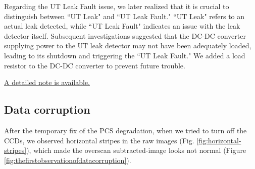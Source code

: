 Regarding the UT Leak Fault issue, we later realized that it is crucial to distinguish between ``UT Leak" and ``UT Leak Fault." ``UT Leak" refers to an actual leak detected, while ``UT Leak Fault" indicates an issue with the leak detector itself. Subsequent investigations suggested that the DC-DC converter supplying power to the UT leak detector may not have been adequately loaded, leading to its shutdown and triggering the ``UT Leak Fault." We added a load resistor to the DC-DC converter to prevent future trouble.

\href{https://rubinobs.atlassian.net/wiki/spaces/CAM/pages/228065378/R24+Reb0+and+UT+leak+detector+fault}{A detailed note is available.}



\clearpage
\subsection{Data corruption}\label{sec:datacorruption}
After the temporary fix of the PCS degradation, when we tried to turn off the CCDs, we observed horizontal stripes in the raw images (Fig. \ref{fig:horizontal-stripes}), which made the overscan subtracted-image looks not normal (Figure \ref{fig:thefirstobservationofdatacorruption}).
